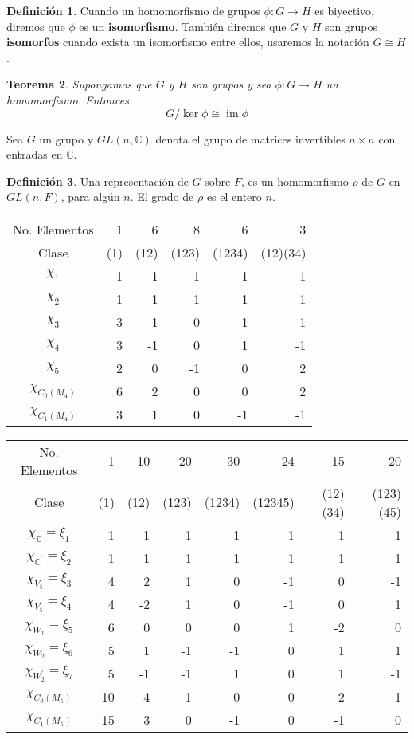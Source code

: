 \documentclass[12pt]{book}
\newtheorem{theorem}{Teorema}[section]
\theoremstyle{definition}
\newtheorem{definition}[theorem]{Definición}
\DeclareMathOperator{\im}{im}
\newcounter{in}
\newcounter{ini}
\begin{document}
\begin{definition}
  Cuando un homomorfismo de grupos $\phi:G\rightarrow H$ es biyectivo,
  diremos que $\phi$ es un  \textbf{isomorfismo}. También diremos que
  $G$ y $H$ son grupos  \textbf{isomorfos} cuando exista un
    isomorfismo entre ellos, usaremos la notación $G\cong H$.
\end{definition}

\begin{theorem}
  Supongamos que $G$ y $H$ son grupos y sea $\phi:G\rightarrow H$ un
  homomorfismo. Entonces $$G/\ker \phi\cong \im \phi$$ 
\end{theorem}

  Sea $G$ un grupo y $GL(n,\mathbb{C})$ denota el grupo de matrices
  invertibles  $n \times n$ con entradas en $\mathbb{C}$.  


\begin{definition}
  Una representación de $G$ sobre $F$, es un homomorfismo $\rho$ de $G$
  en $GL(n,F)$, para algún $n$. El grado de $\rho$ es el entero $n$.
\end{definition}

\bigskip


\begin{tabular}{c|r r r r r}
  No. Elementos& 1 & 6 & 8 & 6 & 3 \\
  Clase & (1) & (12) & (123) & (1234) &(12)(34)\\
    \hline
  $\chi_{{1}}$ & 1 & 1 & 1 & 1 & 1 \\
  $\chi_{{2}}$ & 1 & -1 & 1 & -1 & 1\\
  $\chi_{{3}}$ & 3 & 1 & 0 & -1 & -1\\
  $\chi_{{4}}$ & 3 & -1 & 0 & 1 & -1 \\
  $\chi_{{5}}$ & 2 & 0 & -1 & 0 & 2 \\
    \hline
  $\chi_{C_{0}(M_{4})}$ & 6 & 2 & 0 & 0 & 2 \\
  $\chi_{C_{1}(M_{4})}$ & 3 & 1 & 0 & -1 & -1
\end{tabular}

\bigskip

\begin{tabular}{c |r r r r r r r}
  No. Elementos& 1 & 10 & 20 & 30 & 24 & 15 & 20  \\
  Clase & (1) & (12) & (123) & (1234) & (12345) & (12)(34) & (123)(45) \\
    \hline
  $\chi_{\mathbb{C}}=\xi_{1}$ & 1 & 1 & 1 & 1 & 1 & 1 & 1 \\
  $\chi_{\mathbb{C}^{'}}=\xi_{2}$ & 1 & -1 & 1 & -1 & 1 & 1 & -1\\
  $\chi_{V_{5}}=\xi_{3}$ & 4 & 2 & 1 & 0 & -1 & 0 & -1\\
  $\chi_{V_{5}^{'}}=\xi_{4}$ & 4 & -2 & 1 & 0 & -1 & 0 & 1 \\
  $\chi_{W_{1}}=\xi_{5}$ & 6 & 0 & 0 & 0 & 1 & -2 & 0 \\
  $\chi_{W_{2}}=\xi_{6}$ & 5 & 1 & -1 & -1 & 0 & 1 & 1 \\
  $\chi_{W_{2}^{'}}=\xi_{7}$ & 5 & -1 & -1 & 1 & 0 & 1 & -1 \\
  \hline
  $\chi_{C_{0}(M_{5})}$ & 10 & 4 & 1 & 0 & 0 & 2 & 1 \\
  $\chi_{C_{1}(M_{5})}$ & 15 & 3 & 0 & -1 & 0 & -1 & 0
\end{tabular}
\end{document}
